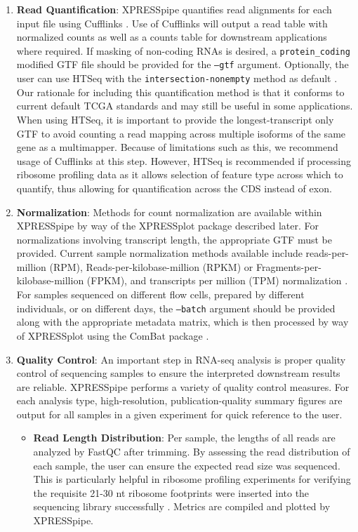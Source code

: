 \documentclass[11pt, a4paper, oneside]{article}
\begin{document}
\begin{enumerate}
  \item \textbf{Read Quantification}: XPRESSpipe quantifies read alignments for each input file using Cufflinks \cite{cufflinks, count_benchmark}. Use of Cufflinks will output a read table with normalized counts as well as a counts table for downstream applications where required. If masking of non-coding RNAs is desired, a \texttt{protein\_coding} modified GTF file should be provided for the \texttt{--gtf} argument. Optionally, the user can use HTSeq with the \texttt{intersection-nonempty} method as default \cite{htseq, count_benchmark}. Our rationale for including this quantification method is that it conforms to current default TCGA standards and may still be useful in some applications. When using HTSeq, it is important to provide the longest-transcript only GTF to avoid counting a read mapping across multiple isoforms of the same gene as a multimapper. Because of limitations such as this, we recommend usage of Cufflinks at this step. However, HTSeq is recommended if processing ribosome profiling data as it allows selection of feature type across which to quantify, thus allowing for quantification across the CDS instead of exon.
  \item \textbf{Normalization}: Methods for count normalization are available within XPRESSpipe by way of the XPRESSplot package described later. For normalizations involving transcript length, the appropriate GTF must be provided. Current sample normalization methods available include reads-per-million (RPM), Reads-per-kilobase-million (RPKM) or Fragments-per-kilobase-million (FPKM), and transcripts per million (TPM) normalization \cite{evans_briefbio}. For samples sequenced on different flow cells, prepared by different individuals, or on different days, the \texttt{--batch} argument should be provided along with the appropriate metadata matrix, which is then processed by way of XPRESSplot using the ComBat package \cite{sva}.
  \item \textbf{Quality Control}:
  An important step in RNA-seq analysis is proper quality control of sequencing samples to ensure the interpreted downstream results are reliable. XPRESSpipe performs a variety of quality control measures. For each analysis type, high-resolution, publication-quality summary figures are output for all samples in a given experiment for quick reference to the user.

    \begin{itemize}
      \item \textbf{Read Length Distribution}: Per sample, the lengths of all reads are analyzed by FastQC \cite{fastqc} after trimming. By assessing the read distribution of each sample, the user can ensure the expected read size was sequenced. This is particularly helpful in ribosome profiling experiments for verifying the requisite 21-30 nt ribosome footprints were inserted into the sequencing library successfully \cite{ingolia_meth}. Metrics are compiled and plotted by XPRESSpipe.


\end{itemize}
\end{enumerate}
\end{document}
